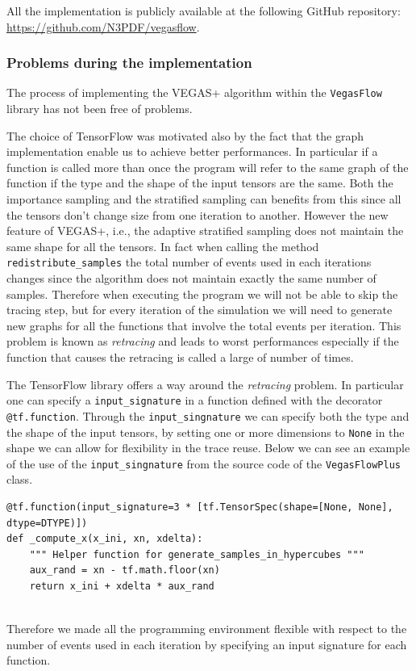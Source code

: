\documentclass[../main/main.tex]{subfiles}
\begin{document}
All the implementation is publicly available at the following GitHub repository: \url{https://github.com/N3PDF/vegasflow}.
\subsubsection{Problems during the implementation}
\label{vfp problem}
The process of implementing the VEGAS+ algorithm within the \texttt{VegasFlow} library has not been free of problems.

The choice of TensorFlow was motivated also by the fact that the graph implementation enable us to achieve better performances. In particular if a function is called more than once the program will refer to the same graph of the function if the type and the shape of the input tensors are the same.
Both the importance sampling and the stratified sampling can benefits from this since all the tensors don't change size from one iteration to another. However the new feature of VEGAS+, i.e., the adaptive stratified sampling does not maintain the same shape for all the tensors.
In fact when calling the method \texttt{redistribute\_samples} the total number of events used in each iterations changes since the algorithm does not maintain exactly the same number of samples.
Therefore when executing the program we will not be able to skip the tracing step, but for every iteration of the simulation we will  need to generate new graphs for all the functions that involve the total events per iteration. This problem is known as \emph{retracing} and leads to worst performances especially if the function that causes the retracing is called a large of number of times.

The TensorFlow library offers a way around the \emph{retracing} problem.
In particular one can specify a \texttt{input\_signature} in a function defined with the decorator \texttt{@tf.function}.
Through the \texttt{input\_singnature} we can specify both the type and the shape of the input tensors, by setting one or more dimensions to \texttt{None} in the shape we can allow for flexibility in the trace reuse. Below we can see an example of the use of the \texttt{input\_singnature} from the source code of the \texttt{VegasFlowPlus} class.
\begin{verbatim}
@tf.function(input_signature=3 * [tf.TensorSpec(shape=[None, None], dtype=DTYPE)])
def _compute_x(x_ini, xn, xdelta):
	""" Helper function for generate_samples_in_hypercubes """
	aux_rand = xn - tf.math.floor(xn)
	return x_ini + xdelta * aux_rand
	
\end{verbatim}
Therefore we made all the programming environment flexible with respect to the number of events used in each iteration by specifying an input signature for each function.
\end{document}
